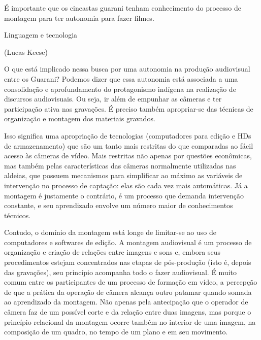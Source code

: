 \documentclass{article}
\begin{document}
\'E importante que os cineastas guarani tenham conhecimento do processo
de montagem para ter autonomia para fazer filmes. 

Linguagem e tecnologia

(Lucas Keese)

O que est\'a implicado nessa busca por uma autonomia na produ\c{c}\~ao
audiovisual entre os Guarani? Podemos dizer que essa autonomia est\'a
associada a uma consolida\c{c}\~ao e aprofundamento do protagonismo
ind\'igena na realiza\c{c}\~ao de discursos audiovisuais. Ou seja, ir
al\'em de empunhar as c\^ameras e ter participa\c{c}\~ao ativa nas
grava\c{c}\~oes. \'E preciso tamb\'em apropriar-se das t\'ecnicas de
organiza\c{c}\~ao e montagem dos materiais gravados.

Isso significa uma apropria\c{c}\~ao de tecnologias (computadores para
edi\c{c}\~ao e HDs de armazenamento) que s\~ao um tanto mais restritas
do que comparadas ao f\'acil acesso \`as c\^ameras de v\'ideo. Mais
restritas n\~ao apenas por quest\~oes econ\^omicas, mas tamb\'em pelas
caracter\'isticas das c\^ameras normalmente utilizadas nas aldeias, que
possuem mecanismos para simplificar ao m\'aximo as vari\'aveis de
interven\c{c}\~ao no processo de capta\c{c}\~ao: elas s\~ao cada vez
mais autom\'aticas. J\'a a montagem \'e justamente o contr\'ario, \'e
um processo que demanda interven\c{c}\~ao constante, e seu aprendizado
envolve um n\'umero maior de conhecimentos t\'ecnicos.

Contudo, o dom\'inio da montagem est\'a longe de limitar-se ao uso de
computadores e softwares de edi\c{c}\~ao. A montagem audiovisual \'e um
processo de organiza\c{c}\~ao e cria\c{c}\~ao de rela\c{c}\~oes entre
imagens e sons e, embora seus procedimentos estejam concentrados nas
etapas de p\'os-produ\c{c}\~ao (isto \'e, depois das grava\c{c}\~oes),
seu princ\'ipio acompanha todo o fazer audiovisual. \'E muito comum
entre os participantes de um processo de forma\c{c}\~ao em v\'ideo, a
percep\c{c}\~ao de que a pr\'atica da opera\c{c}\~ao de c\^amera
alcan\c{c}a outro patamar quando somada ao aprendizado da montagem.
N\~ao apenas pela antecipa\c{c}\~ao que o operador de c\^amera faz de
um poss\'ivel corte e da rela\c{c}\~ao entre duas imagens, mas porque o
princ\'ipio relacional da montagem ocorre tamb\'em no interior de uma
imagem, na composi\c{c}\~ao de um quadro, no tempo de um plano e em seu
movimento.
\end{document}

